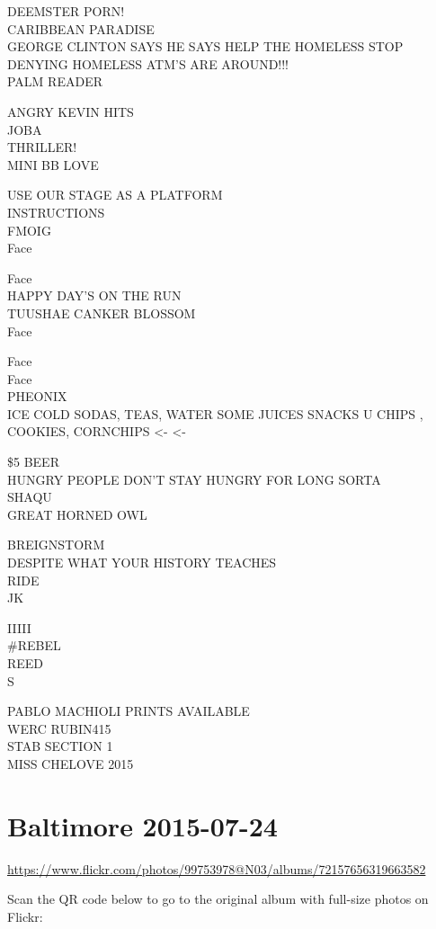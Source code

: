 \documentclass[10pt,letterpaper]{article}
\begin{document}
DEEMSTER PORN!\\
CARIBBEAN PARADISE\\
GEORGE CLINTON SAYS HE SAYS HELP THE HOMELESS STOP DENYING HOMELESS ATM'S ARE AROUND!!!\\
PALM READER

ANGRY KEVIN HITS\\
JOBA\\
THRILLER!\\
MINI BB LOVE

USE OUR STAGE AS A PLATFORM\\
INSTRUCTIONS\\
FMOIG\\
Face

Face\\
HAPPY DAY'S ON THE RUN\\
TUUSHAE CANKER BLOSSOM\\
Face

Face\\
Face\\
PHEONIX\\
ICE COLD SODAS, TEAS, WATER SOME JUICES SNACKS U CHIPS , COOKIES, CORNCHIPS <{-} <{-}

\$5 BEER\\
HUNGRY PEOPLE DON'T STAY HUNGRY FOR LONG SORTA\\
SHAQU\\
GREAT HORNED OWL

BREIGNSTORM\\
DESPITE WHAT YOUR HISTORY TEACHES\\
RIDE\\
JK

IIIII\\
\#REBEL\\
REED\\
S

PABLO MACHIOLI PRINTS AVAILABLE\\
WERC RUBIN415\\
STAB SECTION 1\\
MISS CHELOVE 2015


\section*{Baltimore 2015-07-24}

\url{https://www.flickr.com/photos/99753978@N03/albums/72157656319663582}

Scan the QR code below to go to the original album with full-size photos on Flickr:
\end{document}
